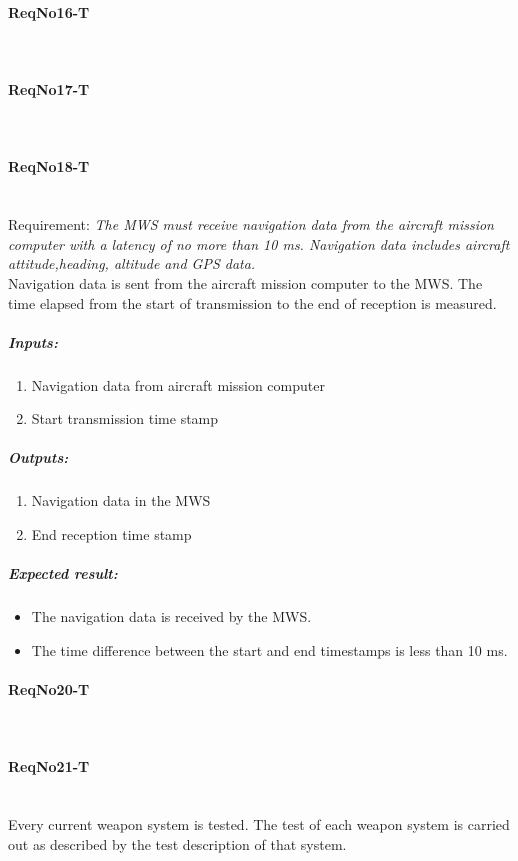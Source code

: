 \paragraph{ReqNo16-T}\mbox{}\\ %


\paragraph{ReqNo17-T}\mbox{}\\ %

\paragraph{ReqNo18-T}\mbox{}\\ %
Requirement: \textit{The MWS must receive navigation data from the aircraft mission computer with a latency of no more than
10 ms. Navigation data includes aircraft attitude,heading, altitude and GPS data.}\\

Navigation data is sent from the aircraft mission computer to the MWS. The time elapsed from the start of transmission to the end of reception is measured.
\subparagraph{Inputs:}
	\begin{enumerate}
	\item Navigation data from aircraft mission computer
	\item Start transmission time stamp
	\end{enumerate}
\subparagraph{Outputs:}
	\begin{enumerate}
	\item Navigation data in the MWS
	\item End reception time stamp
	\end{enumerate}
\subparagraph{Expected result:}
	\begin{itemize}
	\item The navigation data is received by the MWS.
	\item The time difference between the start and end timestamps is less than 10 ms. 
	\end{itemize}

\paragraph{ReqNo20-T}\mbox{}\\ %

\paragraph{ReqNo21-T}\mbox{}\\ %
Every current weapon system is tested. The test of each weapon system is carried out as described by the test description of that system.

